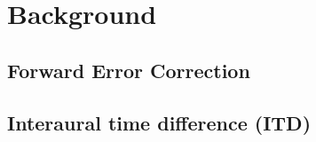 \section{Background}
\subsection{Forward Error Correction}

\subsection{Interaural time difference (ITD)}